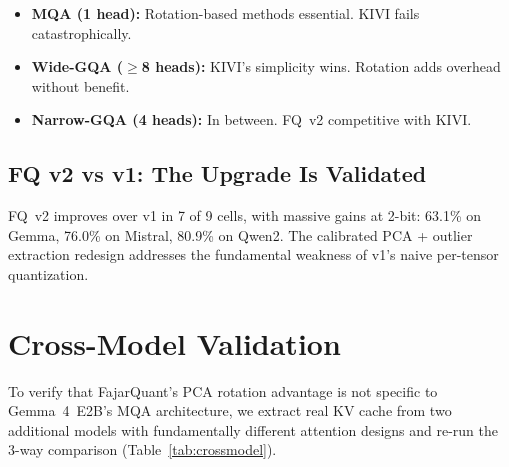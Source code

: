 \documentclass{article}
\begin{document}
\begin{itemize}[nosep]
\item \textbf{MQA (1 head):} Rotation-based methods essential. KIVI
      fails catastrophically.
\item \textbf{Wide-GQA ($\geq$8 heads):} KIVI's simplicity wins.
      Rotation adds overhead without benefit.
\item \textbf{Narrow-GQA (4 heads):} In between. FQ~v2 competitive
      with KIVI.
\end{itemize}

\subsection{FQ v2 vs v1: The Upgrade Is Validated}

FQ~v2 improves over v1 in 7 of 9 cells, with massive gains at 2-bit:
63.1\% on Gemma, 76.0\% on Mistral, 80.9\% on Qwen2. The calibrated
PCA + outlier extraction redesign addresses the fundamental weakness
of v1's naive per-tensor quantization.

\section{Cross-Model Validation}
\label{sec:crossmodel}

To verify that FajarQuant's PCA rotation advantage is not specific to
Gemma~4~E2B's MQA architecture, we extract real KV cache from two
additional models with fundamentally different attention designs and
re-run the 3-way comparison (Table~\ref{tab:crossmodel}).
\end{document}
